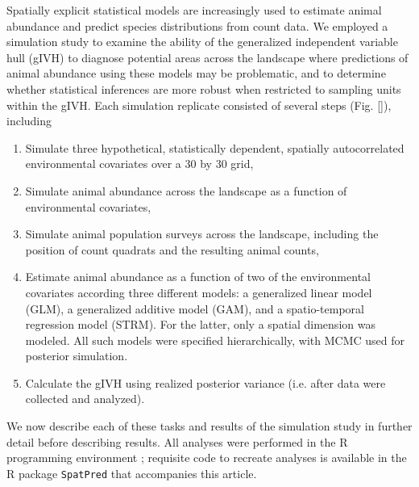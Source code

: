 \documentclass[12pt,fleqn]{article}
\begin{document}
\begin{flushleft}
Spatially explicit statistical models are increasingly used to estimate animal abundance and predict species distributions from count data.  We employed a simulation study to examine the ability of the generalized independent variable hull (gIVH) to diagnose potential areas across the landscape where predictions of animal abundance using these models may be problematic, and to determine whether statistical inferences are more robust when restricted to sampling units within the gIVH.  Each simulation replicate consisted of several steps (Fig. \ref{}), including
\begin{enumerate}
  \item Simulate three hypothetical, statistically dependent, spatially autocorrelated environmental covariates over a 30 by 30 grid,
  \item Simulate animal abundance across the landscape as a function of environmental covariates,
  \item Simulate animal population surveys across the landscape, including the position of count quadrats and the resulting animal counts,
  \item Estimate animal abundance as a function of two of the environmental covariates according three different models: a generalized linear model (GLM), a generalized additive model (GAM), and a spatio-temporal regression model (STRM).  For the latter, only a spatial dimension was modeled.  All such models were specified hierarchically, with MCMC used for posterior simulation.
  \item Calculate the gIVH using realized posterior variance (i.e. after data were collected and analyzed).
\end{enumerate}
We now describe each of these tasks and results of the simulation study in further detail before describing results.  All analyses were performed in the R programming environment \citep{RTeam2012}; requisite code to recreate analyses is available in the R package \texttt{SpatPred} that accompanies this article.


\end{flushleft}
\end{document}
